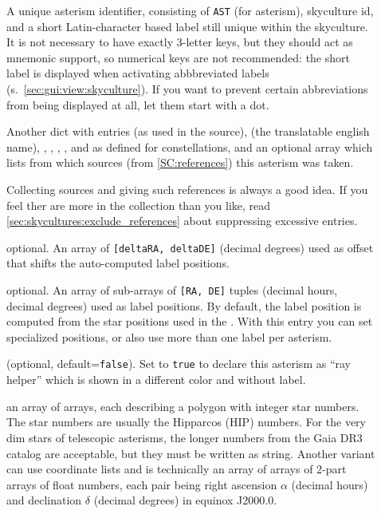 \begin{description}
\item[] A unique asterism identifier, consisting of \texttt{AST} (for asterism), skyculture id, and a short Latin-character based label still unique within the skyculture.
                 It is not necessary to have exactly 3-letter keys, but they should act as mnemonic support, so numerical keys are not recommended:  
				 the short label is displayed when activating abbbreviated labels (s.~\ref{sec:gui:view:skyculture}). If you want to prevent
				 certain abbreviations from being displayed at all, let them start with a dot. 				 
\item[] Another dict with entries  (as used in the source),  (the translatable english name), 
                , , , ,  and  as defined for constellations,
				and an optional array  which lists from which sources (from \ref{SC:references}) this asterism was taken. 

				Collecting sources and giving such references is always a good idea. If you feel ther are more in the collection than you like, 
				read \ref{sec:skycultures:exclude_references} about suppressing excessive entries.
				
\item[] optional. An array of \texttt{[deltaRA, deltaDE]} (decimal degrees)
                            used as offset that shifts the auto-computed label positions. 
				
\item[] optional. An array of sub-arrays of \texttt{[RA, DE]} tuples (decimal hours, decimal degrees) used as label positions. 
                               By default, the label position is computed from the star positions used in the . 
                               With this entry you can set specialized positions, or also use more than one label per asterism. 
\item[] (optional, default=\texttt{false}). 
                Set to \texttt{true} to declare this asterism as ``ray helper'' which is shown in a different color and without label. 
\item[] an array of arrays, each describing a polygon with integer star numbers. The star numbers are usually the Hipparcos (HIP) numbers. 
                    For the very dim stars of telescopic asterisms, the longer numbers from the Gaia DR3 catalog are acceptable, but they must be written as string.
					Another variant can use coordinate lists and is technically an array of arrays of 2-part arrays of float numbers, 
					each pair being right ascension $\alpha$ (decimal hours) and declination $\delta$ (decimal degrees) in equinox J2000.0. 


\end{description}
